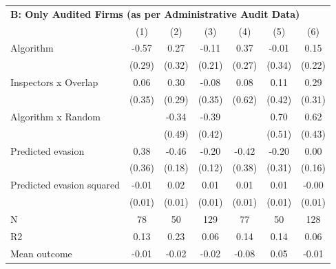 \begin{tabular}{lccc|ccc}
\midrule \multicolumn{7}{l}{\textbf{B: Only Audited Firms (as per Administrative Audit Data)}} \\ \multicolumn{1}{l}{} & (1) & (2) & (3) & (4) & (5) & (6) \\ \midrule

Algorithm   &       -0.57\sym{*}  &        0.27         &       -0.11         &        0.37         &       -0.01         &        0.15         \\
            &      (0.29)         &      (0.32)         &      (0.21)         &      (0.27)         &      (0.34)         &      (0.22)         \\
\addlinespace
Inspectors x Overlap&        0.06         &        0.30         &       -0.08         &        0.08         &        0.11         &        0.29         \\
            &      (0.35)         &      (0.29)         &      (0.35)         &      (0.62)         &      (0.42)         &      (0.31)         \\
\addlinespace
Algorithm x Random&                     &       -0.34         &       -0.39         &                     &        0.70         &        0.62         \\
            &                     &      (0.49)         &      (0.42)         &                     &      (0.51)         &      (0.43)         \\
\addlinespace
Predicted evasion&        0.38         &       -0.46\sym{**} &       -0.20\sym{*}  &       -0.42         &       -0.20         &        0.00         \\
            &      (0.36)         &      (0.18)         &      (0.12)         &      (0.38)         &      (0.31)         &      (0.16)         \\
\addlinespace
Predicted evasion squared&       -0.01         &        0.02\sym{**} &        0.01         &        0.01         &        0.01         &       -0.00         \\
            &      (0.01)         &      (0.01)         &      (0.01)         &      (0.01)         &      (0.01)         &      (0.01)         \\
\midrule
N           &          78         &          50         &         129         &          77         &          50         &         128         \\
R2          &        0.13         &        0.23         &        0.06         &        0.14         &        0.14         &        0.06         \\
Mean outcome&       -0.01         &       -0.02         &       -0.02         &       -0.08         &        0.05         &       -0.01         \\
\bottomrule \end{tabular}
